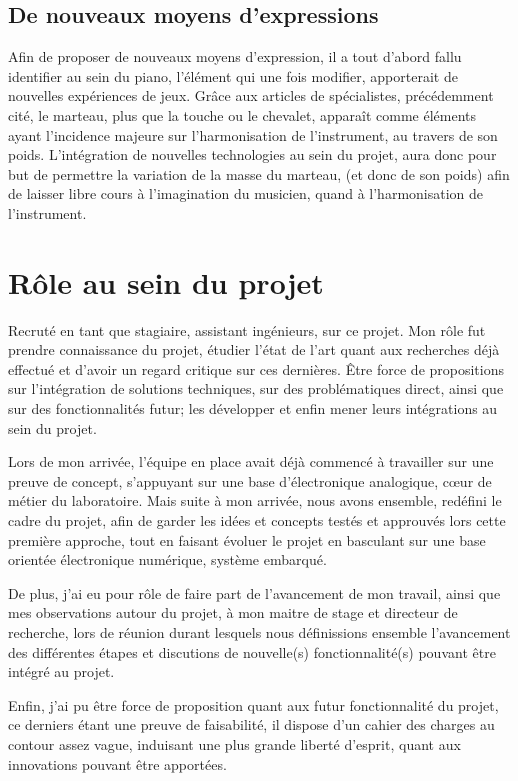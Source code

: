 \documentclass[french,a4paper,12pt]{report}
\begin{document}
		\subsection{De nouveaux moyens d'expressions}
		
		Afin de proposer de nouveaux moyens d'expression, il a tout d'abord fallu identifier au sein du piano, l'élément qui une fois modifier, apporterait de nouvelles expériences de jeux.
		Grâce aux articles de spécialistes, précédemment cité, le marteau, plus que la touche ou le chevalet, apparaît comme éléments ayant l'incidence majeure sur l'harmonisation de l'instrument, au travers de son poids.
		L'intégration de nouvelles technologies au sein du projet, aura donc pour but de permettre la variation de la masse du marteau, (et donc de son poids) afin de laisser libre cours à l'imagination du musicien, quand à l'harmonisation de l'instrument.
	
	\section{Rôle au sein du projet}	
	
	Recruté en tant que stagiaire, assistant ingénieurs, sur ce projet. Mon rôle fut prendre connaissance du projet, étudier l'état de l'art quant aux recherches déjà effectué et d'avoir un regard critique sur ces dernières. Être force de propositions sur l'intégration de solutions techniques, sur des problématiques direct, ainsi que sur des fonctionnalités futur; les développer et enfin mener leurs intégrations au sein du projet.
	
	Lors de mon arrivée, l'équipe en place avait déjà commencé à travailler sur une preuve de concept, s'appuyant sur une base d'électronique analogique, cœur de métier du laboratoire. Mais suite à mon arrivée, nous avons ensemble, redéfini le cadre du projet, afin de garder les idées et concepts testés et approuvés lors cette première approche, tout en faisant évoluer le projet en basculant sur une base orientée électronique numérique, système embarqué.
	
	De plus, j'ai eu pour rôle de faire part de l'avancement de mon travail, ainsi que mes observations autour du projet, à mon maitre de stage et directeur de recherche, lors de réunion durant lesquels nous définissions ensemble l'avancement des différentes étapes et discutions de nouvelle(s) fonctionnalité(s) pouvant être intégré au projet.
	
	Enfin, j'ai pu être force de proposition quant aux futur fonctionnalité du projet, ce derniers étant une preuve de faisabilité, il dispose d'un cahier des charges au contour assez vague, induisant une plus grande liberté d'esprit, quant aux innovations pouvant être apportées.	
	
\end{document}
